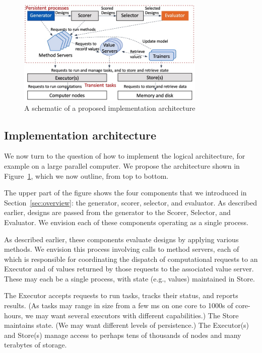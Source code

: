 \documentclass[10pt]{article}
\begin{document}
\begin{figure}
  \centering
  \includegraphics[width=0.8\textwidth,trim=0in 0in 0in 0in,clip]{./Figs/arch.png}
  \vspace{-1.5ex}
  \caption{A schematic of a proposed implementation architecture}
\label{fig:arch}
\end{figure}

\subsection{Implementation architecture}

We now turn to the question of how to implement the logical architecture, for example on a large parallel computer. 
We propose the architecture shown in Figure~\ref{fig:arch}, which we now outline, from top to bottom.

The upper part of the figure shows the four components that we introduced in Section~\ref{sec:overview}:
the generator, scorer, selector, and evaluator. 
As described earlier, designs are passed from the generator to the Scorer, Selector, and Evaluator.
We envision each of these components operating as a single process.

As described earlier, these components evaluate designs by applying various methods. 
We envision this process involving calls to method servers, each of which is responsible for coordinating the dispatch of computational requests
to an Executor and of values returned by those requests to the associated value server.
These may each be a single process, with state (e.g., values) maintained in Store.

The Executor accepts requests to run tasks, tracks their status, and reports results. 
(As tasks may range in size from a few ms on one core to 1000s of core-hours, we may want several executors with different capabilities.) 
The Store maintains state. (We may want different levels of persistence.)
The Executor(s) and Store(s) manage access to perhaps tens of thousands of nodes and many terabytes of storage.
\end{document}
